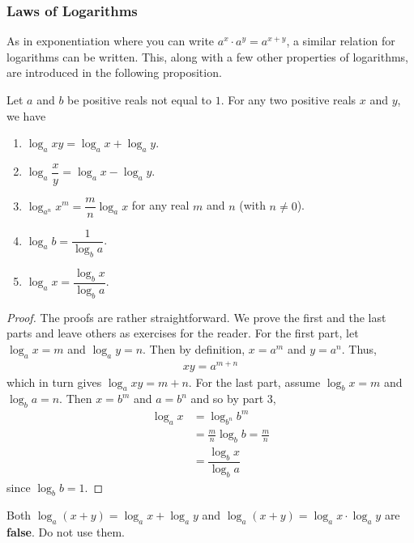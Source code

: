 \subsubsection{Laws of Logarithms}


As in exponentiation where you can write $a^x \cdot a^y = a^{x+y}$, a similar relation for logarithms can be written. This, along with a few other properties of logarithms, are introduced in the following proposition.

\begin{proposition}\label{prop:log_laws}
	Let $a$ and $b$ be positive reals not equal to $1$. For any two positive reals $x$ and $y$, we have
	\begin{enumerate}
		\item $\log_a xy = \log_a x + \log_a y$.
		\item $\log_a \dfrac{x}{y} = \log_a x - \log_a y$.
		\item $\log_{a^n} x^m = \dfrac{m}{n}\log_a x$ for any real $m$ and $n$ (with $n \neq 0$).
		\item $\log_a b = \dfrac{1}{\log_b a}$.
		\item $\log_a x = \dfrac{\log_b x}{\log_b a}$.
	\end{enumerate}
\end{proposition}

\begin{proof}
	The proofs are rather straightforward. We prove the first and the last parts and leave others as exercises for the reader. For the first part, let $\log_a x= m$ and $\log_a y =n$. Then by definition, $x=a^m$ and $y=a^n$. Thus,
	\begin{align*}
		xy=a^{m+n}
	\end{align*}
	which in turn gives $\log_a xy = m+n$. For the last part, assume $\log_b x = m$ and $\log_b a=n$. Then $x=b^m$ and $a=b^n$ and so by part $3$,
	\begin{align*}
		\log_a x
		& = \log_{b^n} b^m\\
		& = \frac{m}{n} \log_b b =\frac{m}{n} \\
		& =\dfrac{\log_b x}{\log_b a}
	\end{align*}
	since $\log_b b =1$.
\end{proof}

\begin{note}
	Both $\log_a (x+y) = \log_a x + \log_a y$ and $\log_a (x+y) = \log_a x \cdot \log_a y$ are \textbf{false}. Do not use them.
\end{note}

